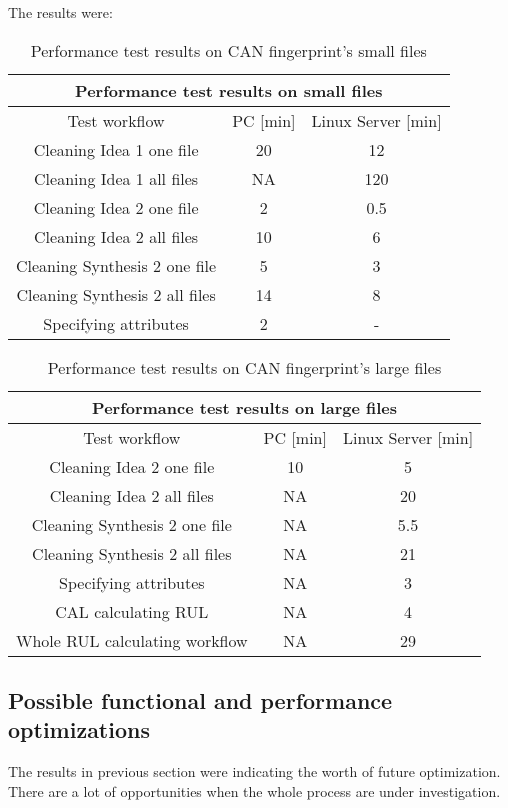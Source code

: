The results were:
\begin{table}[H]
\centering
\begin{tabular}{ |c|c|c|  }
\hline
\multicolumn{3}{|c|}{Performance test results on small files} \\
\hline
Test workflow& PC [min] & Linux Server [min]\\
\hline
Cleaning Idea 1 one file& 20 & 12 \\
Cleaning Idea 1 all files& NA & 120 \\
Cleaning Idea 2 one file& 2 & 0.5 \\
Cleaning Idea 2 all files& 10 & 6 \\
Cleaning Synthesis 2 one file& 5 & 3 \\
Cleaning Synthesis 2 all files& 14 & 8 \\
Specifying attributes & 2 & - \\
\hline
\end{tabular}
\caption{Performance test results on CAN fingerprint's small files}
\label{table:1}
\end{table}

\begin{table}[H]
\centering
\begin{tabular}{ |c|c|c|  }
\hline
\multicolumn{3}{|c|}{Performance test results on large files} \\
\hline
Test workflow& PC [min] & Linux Server [min]\\
\hline
Cleaning Idea 2 one file& 10 & 5 \\
Cleaning Idea 2 all files& NA & 20 \\
Cleaning Synthesis 2 one file& NA & 5.5 \\
Cleaning Synthesis 2 all files& NA & 21 \\
Specifying attributes & NA & 3 \\
CAL calculating RUL & NA & 4 \\
Whole RUL calculating workflow & NA & 29 \\
\hline
\end{tabular}
\caption{Performance test results on CAN fingerprint's large files}
\label{table:2}
\end{table}
\subsection{Possible functional and performance optimizations}
The results in previous section were indicating the worth of future optimization. There are a lot of opportunities when the whole process are under investigation.

